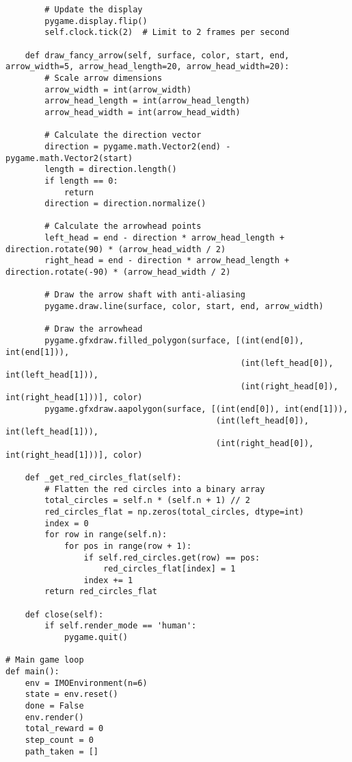 \begin{lstlisting}
        # Update the display
        pygame.display.flip()
        self.clock.tick(2)  # Limit to 2 frames per second

    def draw_fancy_arrow(self, surface, color, start, end, arrow_width=5, arrow_head_length=20, arrow_head_width=20):
        # Scale arrow dimensions
        arrow_width = int(arrow_width)
        arrow_head_length = int(arrow_head_length)
        arrow_head_width = int(arrow_head_width)

        # Calculate the direction vector
        direction = pygame.math.Vector2(end) - pygame.math.Vector2(start)
        length = direction.length()
        if length == 0:
            return
        direction = direction.normalize()

        # Calculate the arrowhead points
        left_head = end - direction * arrow_head_length + direction.rotate(90) * (arrow_head_width / 2)
        right_head = end - direction * arrow_head_length + direction.rotate(-90) * (arrow_head_width / 2)

        # Draw the arrow shaft with anti-aliasing
        pygame.draw.line(surface, color, start, end, arrow_width)

        # Draw the arrowhead
        pygame.gfxdraw.filled_polygon(surface, [(int(end[0]), int(end[1])),
                                                (int(left_head[0]), int(left_head[1])),
                                                (int(right_head[0]), int(right_head[1]))], color)
        pygame.gfxdraw.aapolygon(surface, [(int(end[0]), int(end[1])),
                                           (int(left_head[0]), int(left_head[1])),
                                           (int(right_head[0]), int(right_head[1]))], color)

    def _get_red_circles_flat(self):
        # Flatten the red circles into a binary array
        total_circles = self.n * (self.n + 1) // 2
        red_circles_flat = np.zeros(total_circles, dtype=int)
        index = 0
        for row in range(self.n):
            for pos in range(row + 1):
                if self.red_circles.get(row) == pos:
                    red_circles_flat[index] = 1
                index += 1
        return red_circles_flat

    def close(self):
        if self.render_mode == 'human':
            pygame.quit()

# Main game loop
def main():
    env = IMOEnvironment(n=6)
    state = env.reset()
    done = False
    env.render()
    total_reward = 0
    step_count = 0
    path_taken = []


\end{lstlisting}
